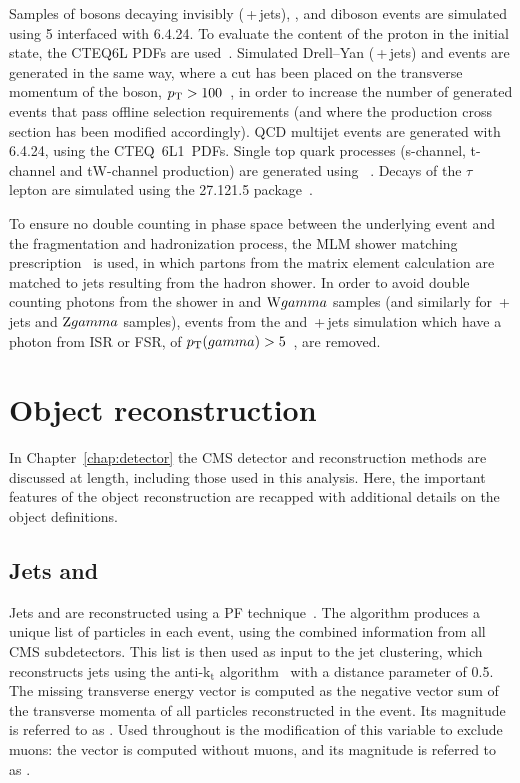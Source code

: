 Samples of \Z bosons decaying invisibly (\znunubr{}\,+\,jets), \ttbar, and diboson events 
are simulated using \MADGRAPH{}5 interfaced with \PYTHIA{}6.4.24. 
To evaluate the content of the proton in the initial state, the CTEQ6L \ac{PDFs} are used~\cite{CTEQ6}. 
Simulated Drell--Yan (\zellellbr{}\,+\,jets) and \wpj{} events are generated in the same way, where a cut has been placed on the transverse momentum of the boson, $p_{\text{T}} > 100$~\GeV, in order to increase the number of generated events that pass offline selection requirements (and where the production cross section has been modified accordingly).
QCD multijet events are generated with \PYTHIA{}6.4.24, using the CTEQ~6L1~\ac{PDFs}. 
Single top quark processes (s-channel, t-channel and tW-channel production) are generated using \POWHEG~\cite{powheg_st,powheg_tw}.
Decays of the $\tau$ lepton are simulated using the \TAUOLA{} 27.121.5 package~\cite{TAUOLA}. 

To ensure no double counting in phase space between the underlying event and the fragmentation and hadronization process, the MLM shower matching prescription~\cite{bib:GEN_MLM} is used, in which partons from the matrix element calculation are matched to jets resulting from the hadron shower.
In order to avoid double counting photons from the \PYTHIA shower in \wpj{} and $\mathrm{W}gamma${} samples (and similarly for \zellellbr{}\,+\,jets and $\mathrm{Z}gamma${} samples), 
events from the \wpj{} and \zellellbr{}\,+\,jets simulation which have a photon from \ac{ISR} or \ac{FSR}, of $p_{\text{T}}(gamma)>5$~\GeV, are removed.


\section{Object reconstruction}
\label{sec:objectReco}

In Chapter~\ref{chap:detector} the CMS detector and reconstruction methods are discussed at length, including those used in this analysis. 
Here, the important features of the object reconstruction are recapped with additional details on the object definitions.

\subsection{Jets and \MET}

Jets and \MET are reconstructed using a \ac{PF}
technique~\cite{PFT-09-001}. The algorithm produces a unique list 
of particles in each event, using the combined information from all 
CMS subdetectors. This list is then used as input to the jet 
clustering, which reconstructs jets using the anti-k$_{\mathrm{t}}$
algorithm~\cite{bib:akjets} with a distance parameter of 0.5.  
The missing transverse energy vector \METv is computed as the negative vector 
sum of the transverse momenta of all particles reconstructed in the 
event.
Its magnitude is referred to as \MET.
Used throughout is the modification of this variable to exclude muons: the vector \METvmu is computed without muons, and its magnitude is referred to as \METmu. 

